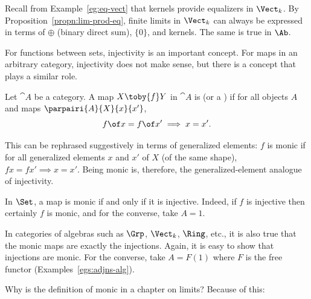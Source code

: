 \begin{example}
Recall from Example~\ref{eg:eq-vect} that kernels provide equalizers in
$\Vect_k$.  By
Proposition~\ref{propn:lim-prod-eq}, finite
limits%
%
%
%
in $\Vect_k$ can always be expressed in terms of $\oplus$ (binary direct
sum), $\{0\}$, and kernels.  The same is true in $\Ab$.
\end{example}




For functions between sets, injectivity is an important concept.  For maps
in an arbitrary category, injectivity does not make sense, but there is a
concept that plays a similar role.

\begin{defn}
Let $\cat{A}$ be a category.  A map $X \toby{f} Y$ in $\cat{A}$ is
%
%
%
(or a )%
%
%
if for all objects $A$ and maps $\parpairi{A}{X}{x}{x'}$,
\[
f \of x = f \of x'
\implies 
x = x'.
\]
\end{defn}

This can be rephrased suggestively in terms of generalized%
%
%
elements: $f$ is monic if for all generalized elements $x$ and $x'$ of $X$
(of the same shape), $fx = fx' \implies x = x'$.  Being monic is,
therefore, the generalized-element analogue of injectivity.%
%
%
%

\begin{example}	
In $\Set$, a map is monic%
%
%
if and only if it is injective.  Indeed, if $f$ is injective then certainly
$f$ is monic, and for the converse, take $A = 1$.
\end{example}

\begin{example}
\label{eg:monics-alg} 
In categories of algebras such as $\Grp$,%
%
%
$\Vect_k$,%
%
%
$\Ring$,%
%
%
etc., it is also true that the monic maps are exactly the injections.
Again, it is easy to show that injections are monic.  For the converse,
take $A = F(1)$ where $F$ is the free functor
(Examples~\ref{egs:adjns-alg}).
\end{example}

Why is the definition of monic in a chapter on limits?  Because of this:

